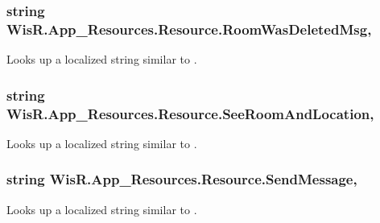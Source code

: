\subsubsection[{Room\+Was\+Deleted\+Msg}]{\setlength{\rightskip}{0pt plus 5cm}string Wis\+R.\+App\+\_\+\+Resources.\+Resource.\+Room\+Was\+Deleted\+Msg\hspace{0.3cm}{\ttfamily [static]}, {\ttfamily [get]}}\label{class_wis_r_1_1_app___resources_1_1_resource_a032a634fb6f21bb649504f72b8f30784}


Looks up a localized string similar to . 

\hypertarget{class_wis_r_1_1_app___resources_1_1_resource_a566f3afb03fc964af58017fafdf5ef7e}{}
\subsubsection[{See\+Room\+And\+Location}]{\setlength{\rightskip}{0pt plus 5cm}string Wis\+R.\+App\+\_\+\+Resources.\+Resource.\+See\+Room\+And\+Location\hspace{0.3cm}{\ttfamily [static]}, {\ttfamily [get]}}\label{class_wis_r_1_1_app___resources_1_1_resource_a566f3afb03fc964af58017fafdf5ef7e}


Looks up a localized string similar to . 

\hypertarget{class_wis_r_1_1_app___resources_1_1_resource_ad52c085c285fa0c4c76c351fdefa0011}{}
\subsubsection[{Send\+Message}]{\setlength{\rightskip}{0pt plus 5cm}string Wis\+R.\+App\+\_\+\+Resources.\+Resource.\+Send\+Message\hspace{0.3cm}{\ttfamily [static]}, {\ttfamily [get]}}\label{class_wis_r_1_1_app___resources_1_1_resource_ad52c085c285fa0c4c76c351fdefa0011}


Looks up a localized string similar to . 

